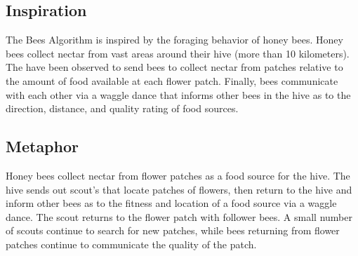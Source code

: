\subsection{Inspiration}
The Bees Algorithm is inspired by the foraging behavior of honey bees.
Honey bees collect nectar from vast areas around their hive (more than 10 kilometers). The have been observed to send bees to collect nectar from patches relative to the amount of food available at each flower patch.
Finally, bees communicate with each other via a waggle dance that informs other bees in the hive as to the direction, distance, and quality rating of food sources.

\subsection{Metaphor}
Honey bees collect nectar from flower patches as a food source for the hive. The hive sends out scout's that locate patches of flowers, then return to the hive and inform other bees as to the fitness and location of a food source via a waggle dance. The scout returns to the flower patch with follower bees. A small number of scouts continue to search for new patches, while bees returning from flower patches continue to communicate the quality of the patch.

